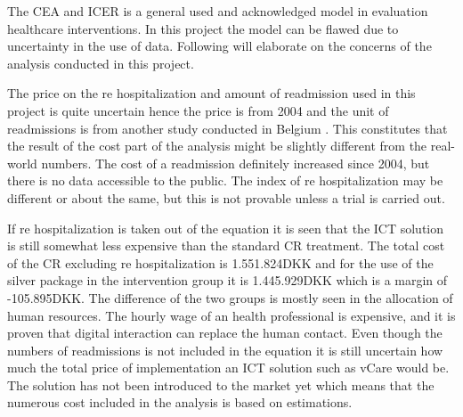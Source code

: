 The CEA and ICER is a general used and acknowledged model in evaluation healthcare interventions. In this project the model can be flawed due to uncertainty in the use of data.  Following will elaborate on the concerns of the analysis conducted in this project. 

The price on the re hospitalization and amount of readmission used in this project is quite uncertain hence the price is from 2004 and the unit of readmissions is from another study conducted in Belgium \cite{costeffect, rasmussen2011hjerterehabilitering}. This constitutes that the result of the cost part of the analysis might be slightly different from the real-world numbers. The cost of a readmission definitely increased since 2004, but there is no data accessible to the public. The index of re hospitalization may be different or about the same, but this is not provable unless a trial is carried out. 

If re hospitalization is taken out of the equation it is seen that the ICT solution is still somewhat less expensive than the standard CR treatment. The total cost of the CR excluding re hospitalization is 1.551.824DKK and for the use of the silver package in the intervention group it is 1.445.929DKK which is a margin of -105.895DKK. The difference of the two groups is mostly seen in the allocation of human resources. The hourly wage of an health professional is expensive, and it is proven that digital interaction can replace the human contact. Even though the numbers of readmissions is not included in the equation it is still uncertain how much the total price of implementation an ICT solution such as vCare would be. The solution has not been introduced to the market yet which means that the numerous cost included in the analysis is based on estimations. 



